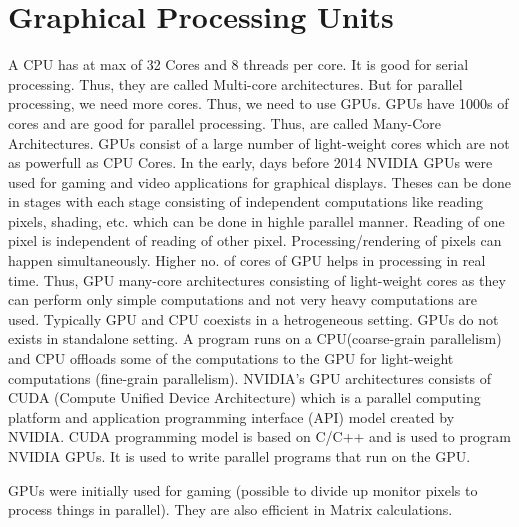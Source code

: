 \documentclass[12pt]{article}
\begin{document}
\section{Graphical Processing Units}
A CPU has at max of 32 Cores and 8 threads per core. It is good for serial processing. Thus, they are called Multi-core architectures.
But for parallel processing, we need more cores. Thus, we need to use GPUs. GPUs have 1000s of cores and are good for parallel processing. Thus, are called Many-Core Architectures.
GPUs consist of a large number of light-weight cores which are not as powerfull as CPU Cores. In the early, days before 2014 NVIDIA GPUs were used for gaming and video applications for graphical 
displays. Theses can be done in stages with each stage consisting of independent computations like reading pixels, shading, etc. which can be done in highle parallel manner. Reading of one pixel is 
independent of reading of other pixel. Processing/rendering of pixels can happen simultaneously. Higher no. of cores of GPU helps in processing in real time. Thus,
GPU many-core architectures consisting of light-weight cores as they can perform only simple computations and not very heavy computations are used.
Typically GPU and CPU coexists in a hetrogeneous setting. GPUs do not exists in standalone setting. 
A program runs on a CPU(coarse-grain parallelism) and CPU offloads some of the computations to the GPU for light-weight computations (fine-grain parallelism).
NVIDIA's GPU architectures consists of CUDA (Compute Unified Device Architecture) which is a parallel computing platform and application programming interface (API) model created by NVIDIA.
CUDA programming model is based on C/C++ and is used to program NVIDIA GPUs. It is used to write parallel programs that run on the GPU.

GPUs were initially used for gaming (possible to divide up monitor pixels to process 
things in parallel). They are also efficient in Matrix calculations.
\end{document}

